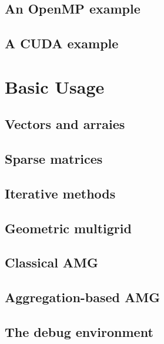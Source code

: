 \documentclass[11pt]{memoir}
\begin{document}
\section{An OpenMP example}

\section{A CUDA example}


\chapter{Basic Usage}\label{ch:basic}

\section{Vectors and arraies}

\section{Sparse matrices}

\section{Iterative methods}

\section{Geometric multigrid}

\section{Classical AMG}

\section{Aggregation-based AMG}

\section{The debug environment}
\end{document}
